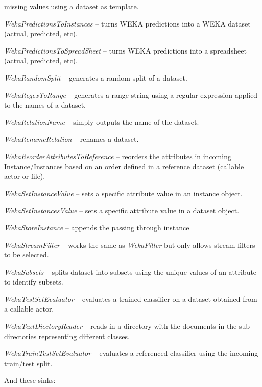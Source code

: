 \begin{tight_itemize}
	missing values using a dataset as template.
	\item \textit{WekaPredictionsToInstances} -- turns WEKA predictions into
	a WEKA dataset (actual, predicted, etc).
	\item \textit{WekaPredictionsToSpreadSheet} -- turns WEKA predictions into
	a spreadsheet (actual, predicted, etc).
	\item \textit{WekaRandomSplit} -- generates a random split of a dataset.
	\item \textit{WekaRegexToRange} -- generates a range string using a regular
	expression applied to the names of a dataset.
	\item \textit{WekaRelationName} -- simply outputs the name of the dataset.
	\item \textit{WekaRenameRelation} -- renames a dataset.
	\item \textit{WekaReorderAttributesToReference} -- reorders the attributes
	in incoming Instance/Instances based on an order defined in a reference
	dataset (callable actor or file).
	\item \textit{WekaSetInstanceValue} -- sets a specific attribute value in
	an instance object.
	\item \textit{WekaSetInstancesValue} -- sets a specific attribute value in
	a dataset object.
	\item \textit{WekaStoreInstance} -- appends the passing through instance 
	\item \textit{WekaStreamFilter} -- works the same as
	\textit{WekaFilter} but only allows stream filters to be selected.
	\item \textit{WekaSubsets} -- splits dataset into subsets using the unique
	values of an attribute to identify subsets.
	\item \textit{WekaTestSetEvaluator} -- evaluates a trained classifier on
	a dataset obtained from a callable actor.
	\item \textit{WekaTextDiectoryReader} -- reads in a directory with the 
	documents in the sub-directories representing different classes.
	\item \textit{WekaTrainTestSetEvaluator} -- evaluates a referenced classifier
	using the incoming train/test split.
\end{tight_itemize}
And these sinks:

